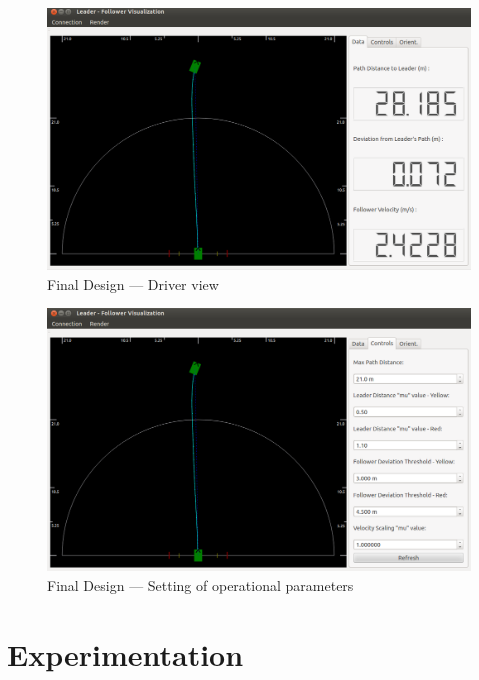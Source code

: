 \documentclass[12pt]{report}
\begin{document}
\begin{figure}[htbp]
    \centering
    \includegraphics[width=6.5in]{./figs/final_design_data.png}
    \caption{Final Design --- Driver view}
    \label{fig:finaldesdriv}
\end{figure}

\begin{figure}[htbp]
    \centering
    \includegraphics[width=6.5in]{./figs/final_design_opts.png}
    \caption{Final Design --- Setting of operational parameters }
    \label{fig:finaldesopts}
\end{figure}


\chapter{Experimentation}
\label{chap:exper}
\end{document}
